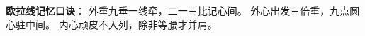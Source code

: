 \begin{summarybox}
\textbf{欧拉线记忆口诀}：
外重九垂一线牵，二一三比记心间。
外心出发三倍重，九点圆心驻中间。
内心顽皮不入列，除非等腰才并肩。
\end{summarybox}